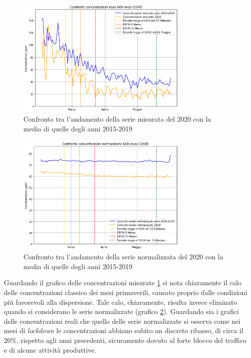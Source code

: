 \begin{figure}[h]
\centering
\includegraphics[width=0.75\textwidth]{nox_covid}
\caption{Confronto tra l'andamento della serie misurata del 2020 con la media di quelle degli anni 2015-2019}
\label{fig:nox_covid}
\end{figure}

\begin{figure}[h]
\centering
\includegraphics[width=0.75\textwidth]{nox_covid_norm}
\caption{Confronto tra l'andamento della serie normalizzata del 2020 con la media di quelle degli anni 2015-2019}
\label{fig:nox_covid_norm}
\end{figure}

Guardando il grafico delle concentrazioni misurate \ref{fig:nox_covid} si nota chiaramente il calo delle concentrazioni classico dei mesi primaverili, causato proprio dalle condizioni più favorevoli alla dispersione. Tale calo, chiaramente, risulta invece eliminato quando si considerano le serie normalizzate (grafico \ref{fig:nox_covid_norm}).
Guardando sia i grafici delle concentrazioni reali che quello delle serie normalizzate si osserva come nei mesi di \textit{lockdown} le concentrazioni abbiano subito un discreto ribasso, di circa il 20\%, rispetto agli anni precedenti, sicuramente dovuto al forte blocco del traffico e di alcune attività produttive.

